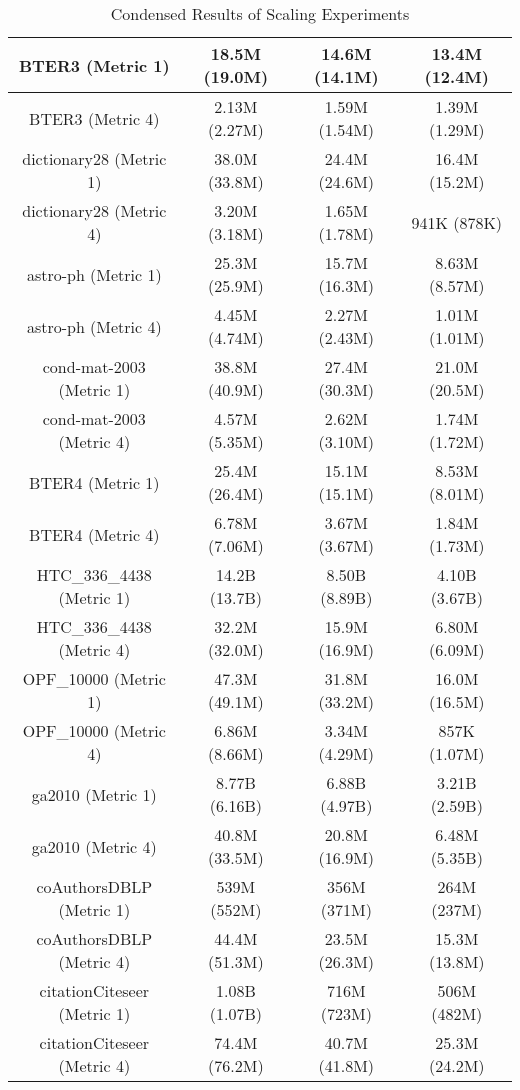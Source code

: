 \documentclass{sig-alternate}
\begin{document}
\begin{table*}[htb!]
{\begin{tabular}{|c|c|c|c|}
BTER3 (Metric 1) & 18.5M (19.0M) & 14.6M (14.1M) & 13.4M (12.4M) \\\hline
BTER3 (Metric 4) & 2.13M (2.27M) & 1.59M (1.54M) & 1.39M (1.29M) \\\hline
dictionary28 (Metric 1) & 38.0M (33.8M) & 24.4M (24.6M) & 16.4M (15.2M) \\\hline
dictionary28 (Metric 4) & 3.20M (3.18M) & 1.65M (1.78M) & 941K (878K) \\\hline
astro-ph (Metric 1) & 25.3M (25.9M) & 15.7M (16.3M) & 8.63M (8.57M) \\\hline
astro-ph (Metric 4) & 4.45M (4.74M) & 2.27M (2.43M) & 1.01M (1.01M) \\\hline
cond-mat-2003 (Metric 1) & 38.8M (40.9M) & 27.4M (30.3M) & 21.0M (20.5M) \\\hline
cond-mat-2003 (Metric 4) & 4.57M (5.35M) & 2.62M (3.10M) & 1.74M (1.72M) \\\hline
BTER4 (Metric 1) & 25.4M (26.4M) & 15.1M (15.1M) & 8.53M (8.01M) \\\hline
BTER4 (Metric 4) & 6.78M (7.06M) & 3.67M (3.67M) & 1.84M (1.73M) \\\hline
HTC\_336\_4438 (Metric 1)& 14.2B (13.7B) & 8.50B (8.89B) & 4.10B (3.67B) \\\hline
HTC\_336\_4438 (Metric 4)& 32.2M (32.0M) & 15.9M (16.9M) & 6.80M (6.09M) \\\hline
OPF\_10000 (Metric 1) & 47.3M (49.1M) & 31.8M (33.2M) & 16.0M (16.5M) \\\hline
OPF\_10000 (Metric 4) & 6.86M (8.66M) & 3.34M (4.29M) & 857K (1.07M) \\\hline
ga2010 (Metric 1) & 8.77B (6.16B) & 6.88B (4.97B) & 3.21B (2.59B)\\\hline
ga2010 (Metric 4) & 40.8M (33.5M) & 20.8M (16.9M) & 6.48M (5.35B)\\\hline
coAuthorsDBLP (Metric 1) & 539M (552M) & 356M (371M) & 264M (237M) \\\hline
coAuthorsDBLP (Metric 4) & 44.4M (51.3M) & 23.5M (26.3M) & 15.3M (13.8M) \\\hline
citationCiteseer (Metric 1) & 1.08B (1.07B) & 716M (723M) & 506M (482M) \\\hline
citationCiteseer (Metric 4) & 74.4M (76.2M) & 40.7M (41.8M) & 25.3M (24.2M) \\\hline

\end{tabular}
}
\caption{Condensed Results of Scaling Experiments\label{table:results}}
\end{table*}
\end{document}
